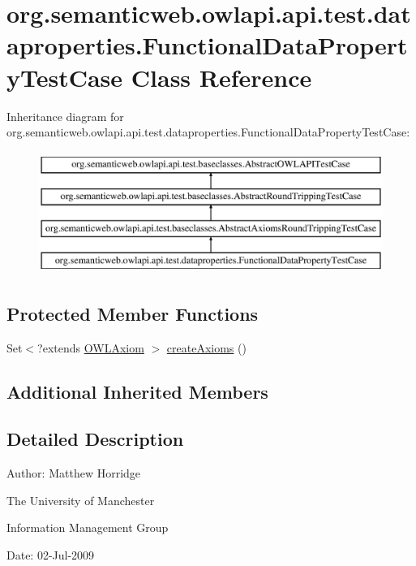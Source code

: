 \hypertarget{classorg_1_1semanticweb_1_1owlapi_1_1api_1_1test_1_1dataproperties_1_1_functional_data_property_test_case}{\section{org.\-semanticweb.\-owlapi.\-api.\-test.\-dataproperties.\-Functional\-Data\-Property\-Test\-Case Class Reference}
\label{classorg_1_1semanticweb_1_1owlapi_1_1api_1_1test_1_1dataproperties_1_1_functional_data_property_test_case}
}
Inheritance diagram for org.\-semanticweb.\-owlapi.\-api.\-test.\-dataproperties.\-Functional\-Data\-Property\-Test\-Case\-:\begin{figure}[H]
\begin{center}
\leavevmode
\includegraphics[height=4.000000cm]{classorg_1_1semanticweb_1_1owlapi_1_1api_1_1test_1_1dataproperties_1_1_functional_data_property_test_case}
\end{center}
\end{figure}
\subsection*{Protected Member Functions}
\begin{DoxyCompactItemize}
\item 
Set$<$?extends \hyperlink{interfaceorg_1_1semanticweb_1_1owlapi_1_1model_1_1_o_w_l_axiom}{O\-W\-L\-Axiom} $>$ \hyperlink{classorg_1_1semanticweb_1_1owlapi_1_1api_1_1test_1_1dataproperties_1_1_functional_data_property_test_case_a6d05cd50b220ab08dfaf56979fc58b24}{create\-Axioms} ()
\end{DoxyCompactItemize}
\subsection*{Additional Inherited Members}


\subsection{Detailed Description}
Author\-: Matthew Horridge\par
 The University of Manchester\par
 Information Management Group\par
 Date\-: 02-\/\-Jul-\/2009 

